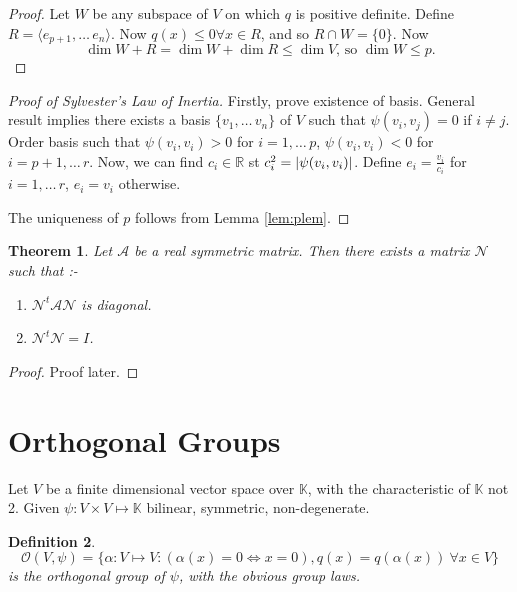 \documentclass{notes}
\theoremstyle{plain}
\newtheorem{theorem}{Theorem}[chapter]
\newtheorem{definition}[theorem]{Definition}
\begin{document}
\begin{proof}
  Let $W$ be any subspace of $V$ on which $q$ is positive definite.
  Define $R = \langle e_{p+1},\dots\,e_n \rangle $.  Now $q(x) \le 0
  \forall x \in R$, and so $R \cap W = \{ 0 \}$.  Now
\[
\dim W+R = \dim W + \dim R \le \dim V \text{, so } \dim W \le p.
\]
\end{proof}

\begin{proof}[Proof of Sylvester's Law of Inertia]
  Firstly, prove existence of basis.  General result implies there
  exists a basis $\{ v_1, \dots\, v_n \}$ of $V$ such that
  $\psi(v_i,v_j) = 0$ if $i \neq j$.  Order basis such that
  $\psi(v_i,v_i) > 0$ for $i=1,\dots\,p$, $\psi(v_i,v_i) < 0$ for
  $i=p+1,\dots\,r$.  Now, we can find $c_i \in \mathbb{R}$ st $c_i^2 =
  \left|\psi(v_i,v_i)\right|$.  Define $e_i=\frac{v_i}{c_i}$ for $i=1,
  \dots\, r$, $e_i = v_i$ otherwise.
  
  The uniqueness of $p$ follows from Lemma \ref{lem:plem}.
\end{proof}

\begin{theorem}
  Let $\mathcal{A}$ be a real symmetric matrix.  Then there exists a
  matrix $\mathcal{N}$ such that :-
\begin{enumerate}
\item $\mathcal{N}^t\mathcal{A}\mathcal{N}$ is diagonal.
\item $\mathcal{N}^t\mathcal{N} = I$.
\end{enumerate}
\end{theorem}

\begin{proof}
  Proof later.
\end{proof}

\section{Orthogonal Groups}

Let $V$ be a finite dimensional vector space over $\mathbb{K}$, with
the characteristic of $\mathbb{K}$ not 2.  Given $\psi : V \times V
\mapsto \mathbb{K}$ bilinear, symmetric, non-degenerate.

\begin{definition}
  \[
\mathcal{O}(V,\psi ) = \{ \alpha \colon V \mapsto V : (\alpha(x)=0
  \Leftrightarrow x=0), q(x) = q(\alpha(x)) \: \forall x \in V \}
\]
 is the orthogonal group of $\psi$, with the obvious group laws.
\end{definition}
\end{document}

